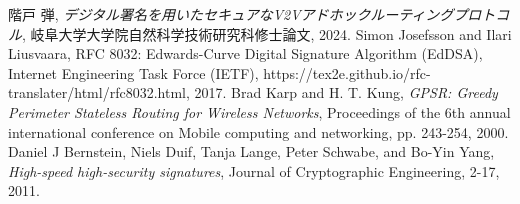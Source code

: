 \documentclass[a4j,9pt,twocolumn]{jsarticle}
\begin{document}
\noindent\hrulefill %
\begin{thebibliography}{99}
     階戸 弾,
        \textit{デジタル署名を用いたセキュアなV2Vアドホックルーティングプロトコル},
            岐阜大学大学院自然科学技術研究科修士論文, 2024.
     Simon Josefsson and Ilari Liusvaara, 
        RFC 8032: Edwards-Curve Digital Signature Algorithm (EdDSA),
        Internet Engineering Task Force (IETF), 
        https://tex2e.github.io/rfc-translater/html/rfc8032.html, 
        2017.
     Brad Karp and H. T. Kung, 
        \textit{GPSR: Greedy Perimeter Stateless Routing for Wireless Networks},
        Proceedings of the 6th annual international conference on Mobile computing and networking,
        pp. 243-254, 
        2000.
     Daniel J Bernstein, Niels Duif, Tanja Lange, Peter Schwabe, and Bo-Yin Yang,
        \textit{High-speed high-security signatures}, Journal of Cryptographic Engineering,
        2-17, 2011.
\end{thebibliography}

\end{document}

